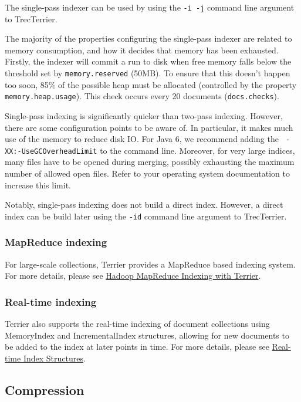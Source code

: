 The single-pass indexer can be used by using the \texttt{-i\ -j} command
line argument to TrecTerrier.

The majority of the properties configuring the single-pass indexer are
related to memory consumption, and how it decides that memory has been
exhausted. Firstly, the indexer will commit a run to disk when free
memory falls below the threshold set by \texttt{memory.reserved} (50MB).
To ensure that this doesn't happen too soon, 85\% of the possible heap
must be allocated (controlled by the property
\texttt{memory.heap.usage}). This check occurs every 20 documents
(\texttt{docs.checks}).

Single-pass indexing is significantly quicker than two-pass indexing.
However, there are some configuration points to be aware of. In
particular, it makes much use of the memory to reduce disk IO. For Java
6, we recommend adding the \texttt{\ -XX:-UseGCOverheadLimit} to the
command line. Moreover, for very large indices, many files have to be
opened during merging, possibly exhausting the maximum number of allowed
open files. Refer to your operating system documentation to increase
this limit.

Notably, single-pass indexing does not build a direct index. However, a
direct index can be build later using the \texttt{-id} command line
argument to TrecTerrier.

\subsubsection{MapReduce indexing}\label{mapreduce-indexing}

For large-scale collections, Terrier provides a MapReduce based indexing
system. For more details, please see \href{hadoop_indexing.html}{Hadoop
MapReduce Indexing with Terrier}.

\subsubsection{Real-time indexing}\label{real-time-indexing}

Terrier also supports the real-time indexing of document collections
using MemoryIndex and IncrementalIndex structures, allowing for new
documents to be added to the index at later points in time. For more
details, please see \href{realtime_indices.html}{Real-time Index
Structures}.

\subsection{Compression}\label{compression}

